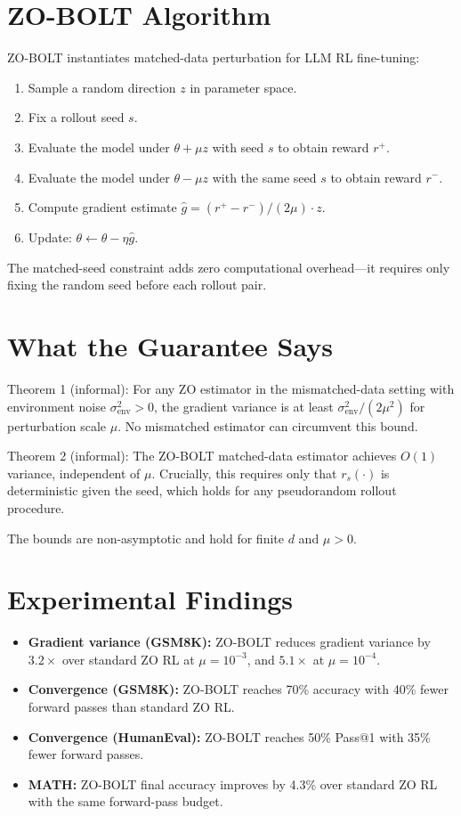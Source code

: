 \documentclass[10pt,twocolumn]{article}
\begin{document}
\section{ZO-BOLT Algorithm}

ZO-BOLT instantiates matched-data perturbation for LLM RL fine-tuning:

\begin{enumerate}[itemsep=2pt,parsep=0pt]
  \item Sample a random direction $z$ in parameter space.
  \item Fix a rollout seed $s$.
  \item Evaluate the model under $\theta + \mu z$ with seed $s$ to
    obtain reward $r^+$.
  \item Evaluate the model under $\theta - \mu z$ with the same seed $s$
    to obtain reward $r^-$.
  \item Compute gradient estimate $\hat{g} = (r^+ - r^-)/(2\mu) \cdot z$.
  \item Update: $\theta \leftarrow \theta - \eta \hat{g}$.
\end{enumerate}

The matched-seed constraint adds zero computational overhead---it
requires only fixing the random seed before each rollout pair.

\section{What the Guarantee Says}

Theorem 1 (informal): For any ZO estimator in the mismatched-data
setting with environment noise $\sigma^2_\text{env} > 0$, the gradient
variance is at least $\sigma^2_\text{env}/(2\mu^2)$ for perturbation
scale $\mu$. No mismatched estimator can circumvent this bound.

Theorem 2 (informal): The ZO-BOLT matched-data estimator achieves
$O(1)$ variance, independent of $\mu$. Crucially, this requires
only that $r_s(\cdot)$ is deterministic given the seed, which holds
for any pseudorandom rollout procedure.

The bounds are non-asymptotic and hold for finite $d$ and $\mu > 0$.

\section{Experimental Findings}

\begin{itemize}[itemsep=2pt,parsep=0pt]
  \item \textbf{Gradient variance (GSM8K):} ZO-BOLT reduces gradient
    variance by $3.2\times$ over standard ZO RL at $\mu = 10^{-3}$,
    and $5.1\times$ at $\mu = 10^{-4}$.
  \item \textbf{Convergence (GSM8K):} ZO-BOLT reaches 70\% accuracy
    with 40\% fewer forward passes than standard ZO RL.
  \item \textbf{Convergence (HumanEval):} ZO-BOLT reaches 50\% Pass@1
    with 35\% fewer forward passes.
  \item \textbf{MATH:} ZO-BOLT final accuracy improves by 4.3\%
    over standard ZO RL with the same forward-pass budget.
\end{itemize}
\end{document}
